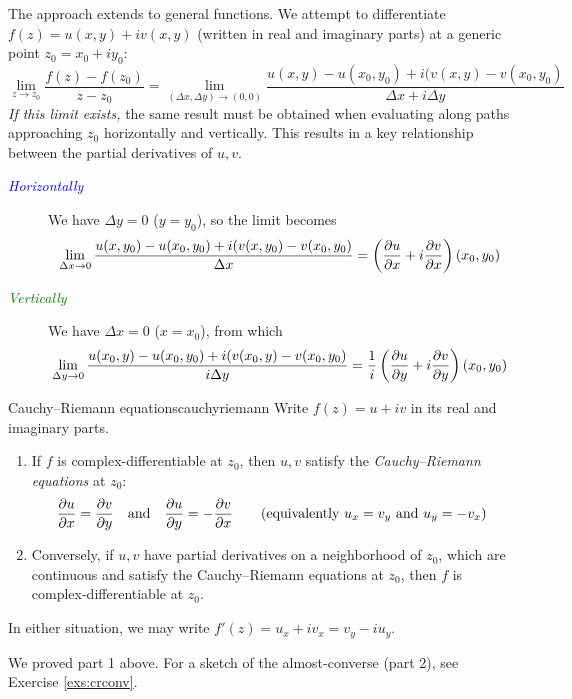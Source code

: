 The approach extends to general functions. We attempt to differentiate $f(z)=u(x,y)+iv(x,y)$ (written in real and imaginary parts) at a generic point $z_0=x_0+iy_0$:
\[
	\lim\limits_{z\to z_0}\frac{f(z)-f(z_0)}{z-z_0}= \lim\limits_{(\Delta x,\Delta y)\to (0,0)}\frac{u(x,y)-u(x_0,y_0)+i(v(x,y)-v(x_0,y_0)}{\Delta x+i\Delta y}
\]
\emph{If this limit exists,} the same result must be obtained when evaluating along paths approaching $z_0$ horizontally and vertically. This results in a key relationship between the partial derivatives of $u,v$.
\begin{description}
	\item[\normalfont\emph{\textcolor{blue}{Horizontally}}]\quad We have $\Delta y=0$ ($y=y_0$), so the limit becomes
	\[
		\lim_{\Delta x\to 0} \frac{u(x,y_0)-u(x_0,y_0)+i(v(x,y_0)-v(x_0,y_0)}{\Delta x} =\left(\partials[u]{x}+i\partials[v]{x}\right)(x_0,y_0)
	\]
	\item[\normalfont\emph{\textcolor{Green}{Vertically}}]\quad We have $\Delta x=0$ ($x=x_0$), from which
	\[
		\lim_{\Delta y\to 0} \frac{u(x_0,y)-u(x_0,y_0)+i(v(x_0,y)-v(x_0,y_0)}{i\Delta y} =\frac 1i\left(\partials[u]{y}+i\partials[v]{y}\right)(x_0,y_0)
	\]
\end{description}

\begin{thm}{Cauchy--Riemann equations}{cauchyriemann}
	Write $f(z)=u+iv$ in its real and imaginary parts.
	\begin{enumerate}
	  \item If $f$ is complex-differentiable at $z_0$, then $u,v$ satisfy the \emph{Cauchy--Riemann equations} at $z_0$:
		\[
			\partials[u]{x}=\partials[v]{y} \quad\text{and}\quad \partials[u]{y}=-\partials[v]{x} \tag{equivalently $u_x=v_y$ and $u_y=-v_x$}
		\]
	  \item Conversely, if $u,v$ have partial derivatives on a neighborhood of $z_0$, which are continuous and satisfy the Cauchy--Riemann equations at $z_0$, then $f$ is complex-differentiable at $z_0$.
	\end{enumerate}
	In either situation, we may write $f'(z)=u_x+iv_x =v_y-iu_y$.
\end{thm}
We proved part 1 above. For a sketch of the almost-converse (part 2), see Exercise \ref{exs:crconv}.


\goodbreak


